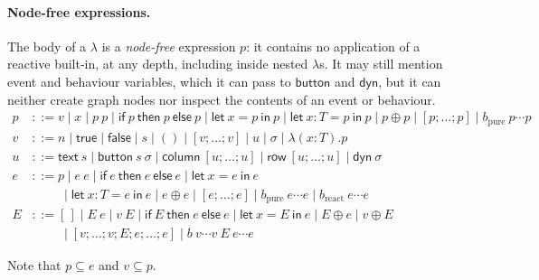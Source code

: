 \documentclass{article}
\newcommand{\kw}[1]{\mathsf{#1}}
\begin{document}
\paragraph{Node-free expressions.} The body of a $\lambda$ is a \emph{node-free} expression $p$: it contains no application of a reactive built-in, at any depth, including inside nested $\lambda$s. It may still mention event and behaviour variables, which it can pass to $\kw{button}$ and $\kw{dyn}$, but it can neither create graph nodes nor inspect the contents of an event or behaviour.
\begin{align*}
p &::= v \mid x \mid p\ p \mid \kw{if}\ p\ \kw{then}\ p\ \kw{else}\ p \mid \kw{let}\ x = p\ \kw{in}\ p \mid \kw{let}\ x{:}T = p\ \kw{in}\ p \mid p \oplus p \mid [p;\dots;p] \mid b_{\mathrm{pure}}\ p\cdots p\\
v &::= n \mid \kw{true} \mid \kw{false} \mid s \mid () \mid [v;\dots;v] \mid u \mid \sigma \mid \lambda(x{:}T).p\\
u &::= \kw{text}\ s \mid \kw{button}\ s\ \sigma \mid \kw{column}\ [u;\dots;u] \mid \kw{row}\ [u;\dots;u] \mid \kw{dyn}\ \sigma\\
e &::= p \mid e\ e \mid \kw{if}\ e\ \kw{then}\ e\ \kw{else}\ e \mid \kw{let}\ x = e\ \kw{in}\ e\\
  &\phantom{::=}\ \mid \kw{let}\ x{:}T = e\ \kw{in}\ e \mid e \oplus e \mid [e;\dots;e] \mid b_{\mathrm{pure}}\ e\cdots e \mid b_{\mathrm{react}}\ e\cdots e\\
E &::= [\,] \mid E\ e \mid v\ E \mid \kw{if}\ E\ \kw{then}\ e\ \kw{else}\ e \mid \kw{let}\ x = E\ \kw{in}\ e \mid E \oplus e \mid v \oplus E\\
  &\phantom{::=}\ \mid [v;\dots;v;E;e;\dots;e] \mid b\ v\cdots v\ E\ e\cdots e
\end{align*}

Note that $ p \subseteq e $ and $ v \subseteq p $.
\end{document}
